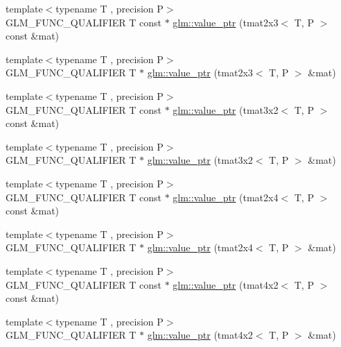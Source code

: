 \begin{DoxyCompactItemize}
\item 
{\footnotesize template$<$typename T , precision P$>$ }\\G\-L\-M\-\_\-\-F\-U\-N\-C\-\_\-\-Q\-U\-A\-L\-I\-F\-I\-E\-R T const $\ast$ \hyperlink{group__gtc__type__ptr_ga968f2c8899914ea1c1daaaded8daa6b5}{glm\-::value\-\_\-ptr} (tmat2x3$<$ T, P $>$ const \&mat)
\item 
{\footnotesize template$<$typename T , precision P$>$ }\\G\-L\-M\-\_\-\-F\-U\-N\-C\-\_\-\-Q\-U\-A\-L\-I\-F\-I\-E\-R T $\ast$ \hyperlink{group__gtc__type__ptr_ga36fb9a17664c8b6848a5d005e4068a2f}{glm\-::value\-\_\-ptr} (tmat2x3$<$ T, P $>$ \&mat)
\item 
{\footnotesize template$<$typename T , precision P$>$ }\\G\-L\-M\-\_\-\-F\-U\-N\-C\-\_\-\-Q\-U\-A\-L\-I\-F\-I\-E\-R T const $\ast$ \hyperlink{group__gtc__type__ptr_ga398202d6ce304deb7da50badde85ee41}{glm\-::value\-\_\-ptr} (tmat3x2$<$ T, P $>$ const \&mat)
\item 
{\footnotesize template$<$typename T , precision P$>$ }\\G\-L\-M\-\_\-\-F\-U\-N\-C\-\_\-\-Q\-U\-A\-L\-I\-F\-I\-E\-R T $\ast$ \hyperlink{group__gtc__type__ptr_gad6a737f57febdef255873f6a44d0db0e}{glm\-::value\-\_\-ptr} (tmat3x2$<$ T, P $>$ \&mat)
\item 
{\footnotesize template$<$typename T , precision P$>$ }\\G\-L\-M\-\_\-\-F\-U\-N\-C\-\_\-\-Q\-U\-A\-L\-I\-F\-I\-E\-R T const $\ast$ \hyperlink{group__gtc__type__ptr_ga2336cd68e72b0d295c8cd33eb1588480}{glm\-::value\-\_\-ptr} (tmat2x4$<$ T, P $>$ const \&mat)
\item 
{\footnotesize template$<$typename T , precision P$>$ }\\G\-L\-M\-\_\-\-F\-U\-N\-C\-\_\-\-Q\-U\-A\-L\-I\-F\-I\-E\-R T $\ast$ \hyperlink{group__gtc__type__ptr_ga0d745a55255710933effd6391307f681}{glm\-::value\-\_\-ptr} (tmat2x4$<$ T, P $>$ \&mat)
\item 
{\footnotesize template$<$typename T , precision P$>$ }\\G\-L\-M\-\_\-\-F\-U\-N\-C\-\_\-\-Q\-U\-A\-L\-I\-F\-I\-E\-R T const $\ast$ \hyperlink{group__gtc__type__ptr_ga1de002422f32c6da9d65d3f257f37196}{glm\-::value\-\_\-ptr} (tmat4x2$<$ T, P $>$ const \&mat)
\item 
{\footnotesize template$<$typename T , precision P$>$ }\\G\-L\-M\-\_\-\-F\-U\-N\-C\-\_\-\-Q\-U\-A\-L\-I\-F\-I\-E\-R T $\ast$ \hyperlink{group__gtc__type__ptr_ga0e62660f9066864568cd74d76d528a6e}{glm\-::value\-\_\-ptr} (tmat4x2$<$ T, P $>$ \&mat)

\end{DoxyCompactItemize}
